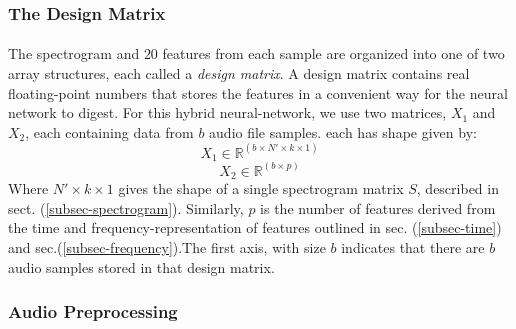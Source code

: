 \documentclass[12pt,letterpaper]{article}
\begin{document}
\newpage


\subsubsection{The Design Matrix}

\paragraph*{}The spectrogram and $20$ features from each sample are organized into one of two array structures, each called a \textit{design matrix}. A design matrix contains real floating-point numbers that stores the features in a convenient way for the neural network to digest. For this hybrid neural-network, we use two matrices, $X_1$ and $X_2$, each containing data from $b$ audio file samples. each has shape given by:
\begin{equation}
\label{eqn-X1Shape}
X_1 \in \mathbb{R}^{(b \times N' \times k \times 1)}
\end{equation}
\begin{equation}
\label{eqn-X2Shape}
X_2 \in \mathbb{R}^{(b \times p)}
\end{equation}
Where $N' \times k \times 1$ gives the shape of a single spectrogram matrix $S$, described in sect. (\ref{subsec-spectrogram}). Similarly, $p$ is the number of features derived from the time and frequency-representation of features outlined in sec. (\ref{subsec-time}) and sec.(\ref{subsec-frequency}).The first axis, with size $b$ indicates that there are $b$ audio samples stored in that design matrix.


\subsubsection{Audio Preprocessing}
\label{subsubsec-Preprocessing}
\end{document}
